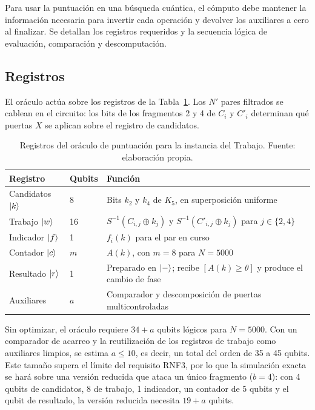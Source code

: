 Para usar la puntuación en una búsqueda cuántica, el cómputo debe mantener la información necesaria para invertir cada operación y devolver los auxiliares a cero al finalizar. Se detallan los registros requeridos y la secuencia lógica de evaluación, comparación y descomputación.

\subsection{Registros}

El oráculo actúa sobre los registros de la Tabla~\ref{tab:registros}. Los \(N'\) pares filtrados se cablean en el circuito: los bits de los fragmentos 2 y 4 de \(C_i\) y \(C'_i\) determinan qué puertas \(X\) se aplican sobre el registro de candidatos.

\begin{table}[H]
\centering
\small
\begin{tabular}{p{} p{} p{}}
\hline\hline
Registro & Qubits & Función \\
\hline
Candidatos \(\lvert k\rangle\) & 8 & Bits \(k_2\) y \(k_4\) de \(K_5\), en superposición uniforme \\
Trabajo \(\lvert w\rangle\) & 16 & \(S^{-1}(C_{i,j}\oplus k_j)\) y \(S^{-1}(C'_{i,j}\oplus k_j)\) para \(j\in\{2,4\}\) \\
Indicador \(\lvert f\rangle\) & 1 & \(f_i(k)\) para el par en curso \\
Contador \(\lvert c\rangle\) & \(m\) & \(A(k)\), con \(m=8\) para \(N=5000\) \\
Resultado \(\lvert r\rangle\) & 1 & Preparado en \(\lvert -\rangle\); recibe \([A(k)\ge\theta]\) y produce el cambio de fase \\
Auxiliares & \(a\) & Comparador y descomposición de puertas multicontroladas \\
\hline
\end{tabular}
\caption[Registros del oráculo de puntuación]{Registros del oráculo de puntuación para la instancia del Trabajo. Fuente: elaboración propia.}
\label{tab:registros}
\end{table}

Sin optimizar, el oráculo requiere \(34+a\) qubits lógicos para \(N=5000\). Con un comparador de acarreo \citep{cuccaro2004} y la reutilización de los registros de trabajo como auxiliares limpios, se estima \(a\le 10\), es decir, un total del orden de 35 a 45 qubits. Este tamaño supera el límite del requisito RNF3, por lo que la simulación exacta se hará sobre una versión reducida que ataca un único fragmento (\(b=4\)): con 4 qubits de candidatos, 8 de trabajo, 1 indicador, un contador de 5 qubits y el qubit de resultado, la versión reducida necesita \(19+a\) qubits.

